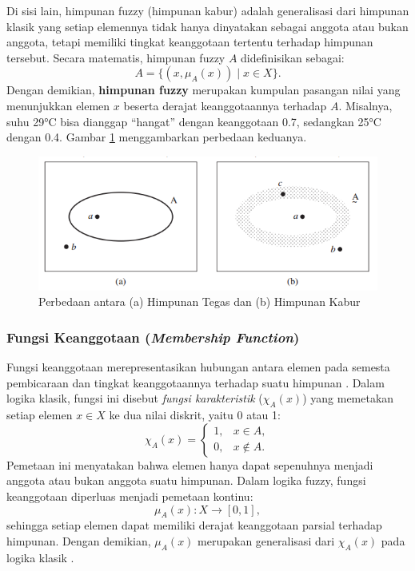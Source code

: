 \documentclass[12pt,a4paper]{article}
\theoremstyle{remark}
\begin{document}
Di sisi lain, himpunan fuzzy (himpunan kabur) adalah generalisasi dari himpunan klasik yang setiap elemennya tidak hanya dinyatakan sebagai anggota atau bukan anggota, tetapi memiliki tingkat keanggotaan tertentu terhadap himpunan tersebut. Secara matematis, himpunan fuzzy \(A\) didefinisikan sebagai:
\[
    A = \{(x, \mu_A(x)) \mid x \in X\}.
\]
Dengan demikian, \textbf{himpunan fuzzy} merupakan kumpulan pasangan nilai yang menunjukkan elemen \(x\) beserta derajat keanggotaannya terhadap \(A\). Misalnya, suhu 29°C bisa dianggap “hangat” dengan keanggotaan 0.7, sedangkan 25°C dengan 0.4. Gambar \ref{fig:crisp_and_fuzzy} menggambarkan perbedaan keduanya.

\begin{figure}[H]
    \centering
    \includegraphics[width=1\linewidth]{images/fuzzy.png}
    \caption{Perbedaan antara (a) Himpunan Tegas dan (b) Himpunan Kabur \cite{ross_fuzzy_2016}}
    \label{fig:crisp_and_fuzzy}
\end{figure}



\subsubsection{Fungsi Keanggotaan (\textit{Membership Function})}
Fungsi keanggotaan merepresentasikan hubungan antara elemen pada semesta pembicaraan dan tingkat keanggotaannya terhadap suatu himpunan \cite{ross_fuzzy_2016}. Dalam logika klasik, fungsi ini disebut \textit{fungsi karakteristik} (\(\chi_A(x)\)) yang memetakan setiap elemen \(x \in X\) ke dua nilai diskrit, yaitu 0 atau 1:
\[
    \chi_A(x) =
    \begin{cases}
        1, & x \in A,    \\
        0, & x \notin A.
    \end{cases}
\]
Pemetaan ini menyatakan bahwa elemen hanya dapat sepenuhnya menjadi anggota atau bukan anggota suatu himpunan. Dalam logika fuzzy, fungsi keanggotaan diperluas menjadi pemetaan kontinu:
\[
    \mu_A(x) : X \rightarrow [0,1],
\]
sehingga setiap elemen dapat memiliki derajat keanggotaan parsial terhadap himpunan. Dengan demikian, \(\mu_A(x)\) merupakan generalisasi dari \(\chi_A(x)\) pada logika klasik \cite{ross_fuzzy_2016}.
\end{document}
